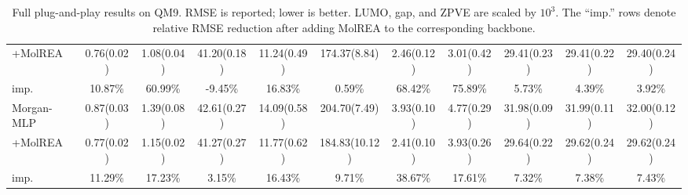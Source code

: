 \begin{table}[t]
{\begin{tabular}{l*{10}{c}}
+MolREA & 0.76(0.02) & 1.08(0.04) & 41.20(0.18) & 11.24(0.49) & 174.37(8.84) & 2.46(0.12) & 3.01(0.42) & 29.41(0.23) & 29.41(0.22) & 29.40(0.24) \\
imp. & 10.87\% & 60.99\% & -9.45\% & 16.83\% & 0.59\% & 68.42\% & 75.89\% & 5.73\% & 4.39\% & 3.92\% \\
\hline
Morgan-MLP & 0.87(0.03) & 1.39(0.08) & 42.61(0.27) & 14.09(0.58) & 204.70(7.49) & 3.93(0.10) & 4.77(0.29) & 31.98(0.09) & 31.99(0.11) & 32.00(0.12) \\
+MolREA & 0.77(0.02) & 1.15(0.02) & 41.27(0.27) & 11.77(0.62) & 184.83(10.12) & 2.41(0.10) & 3.93(0.26) & 29.64(0.22) & 29.62(0.24) & 29.62(0.24) \\
imp. & 11.29\% & 17.23\% & 3.15\% & 16.43\% & 9.71\% & 38.67\% & 17.61\% & 7.32\% & 7.38\% & 7.43\% \\
\hline
\end{tabular}
}
\caption{Full plug-and-play results on QM9. RMSE is reported; lower is better. LUMO, gap, and ZPVE are scaled by $10^3$. The ``imp.'' rows denote relative RMSE reduction after adding MolREA to the corresponding backbone.}
\label{tab:qm9_full}
\end{table}
